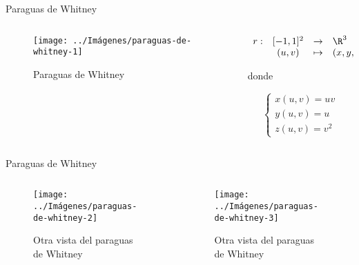 \documentclass[10pt]{beamer}
\begin{document}
	\begin{frame}{Paraguas de Whitney}
		\begin{columns}[t] %
			\begin{column}{.50\textwidth}
				\begin{figure}
					\centering
					\texttt{[image: ../Imágenes/paraguas-de-whitney-1]}
					\caption{Paraguas de Whitney}
					\label{fig:paraguas-de-Whitney-1}
				\end{figure}
			\end{column}%
			\hfill%
			\begin{column}{.50\textwidth}
				$$\begin{array}{rcll}
				r : & [-1, 1]^2 & \to & \R^3\\
				& (u,v) & \mapsto & (x,y,z)
				\end{array}$$
				
				donde 
				
				$$ \begin{cases}
				x(u,v) = uv \\
				y(u,v) = u \\
				z(u,v) = v^2
				\end{cases} $$
			\end{column}%
		\end{columns}
	\end{frame}
	
	\begin{frame}{Paraguas de Whitney}
		\begin{columns}[b] %
			\begin{column}{.50\textwidth}
				\begin{figure}
					\centering
					\texttt{[image: ../Imágenes/paraguas-de-whitney-2]}
					\caption{Otra vista del paraguas de Whitney}
					\label{fig:paraguas-de-Whitney-2}
				\end{figure}
			\end{column}%
			\hfill%
			\begin{column}{.50\textwidth}
				\begin{figure}
					\centering
					\texttt{[image: ../Imágenes/paraguas-de-whitney-3]}
					\caption{Otra vista del paraguas de Whitney}
					\label{fig:paraguas-de-Whitney-3}
				\end{figure}
			\end{column}%
		\end{columns}
	\end{frame}
	
\end{document}
